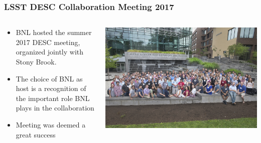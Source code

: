 \documentclass[aspectratio=169]{beamer}
\begin{document}
\begin{frame}
  \frametitle{LSST DESC Collaboration Meeting 2017 }
  
  \begin{columns}
    \begin{column}{0.4\textwidth}
      \begin{itemize}
    \item BNL hosted the summer 2017 DESC meeting, organized jointly
        with Stony Brook.
      \item The choice of BNL as host is a recognition of the important role
          BNL plays in the collaboration
      \item Meeting was deemed a great success

      \end{itemize}
    \end{column}
    \begin{column}{0.6\textwidth}
      \includegraphics[width=\linewidth]{./D0680717.jpg}
    \end{column}
  \end{columns}


\end{frame}

{
\frame
{
}
}
\end{document}
